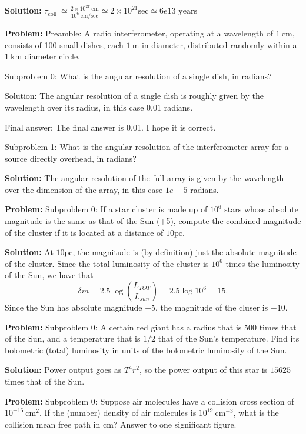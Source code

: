 \documentclass[10pt]{article}
\begin{document}
\textbf{Solution:}
$\tau_{\text {coll }} \simeq \frac{2 \times 10^{27} \mathrm{~cm}}{10^{6} \mathrm{~cm} / \mathrm{sec}} \simeq 2 \times 10^{21} \mathrm{sec} \simeq \boxed{6e13} \text { years }$


\textbf{Problem:}
Preamble: A radio interferometer, operating at a wavelength of $1 \mathrm{~cm}$, consists of 100 small dishes, each $1 \mathrm{~m}$ in diameter, distributed randomly within a $1 \mathrm{~km}$ diameter circle. 

Subproblem 0: What is the angular resolution of a single dish, in radians?


Solution: The angular resolution of a single dish is roughly given by the wavelength over its radius, in this case $\boxed{0.01}$ radians.

Final answer: The final answer is 0.01. I hope it is correct.

Subproblem 1: What is the angular resolution of the interferometer array for a source directly overhead, in radians?


\textbf{Solution:}
The angular resolution of the full array is given by the wavelength over the dimension of the array, in this case $\boxed{1e-5}$ radians.


\textbf{Problem:}
Subproblem 0: If a star cluster is made up of $10^{6}$ stars whose absolute magnitude is the same as that of the Sun (+5), compute the combined magnitude of the cluster if it is located at a distance of $10 \mathrm{pc}$.


\textbf{Solution:}
At $10 \mathrm{pc}$, the magnitude is (by definition) just the absolute magnitude of the cluster.  Since the total luminosity of the cluster is $10^{6}$ times the luminosity of the Sun, we have that 
\begin{equation}
\delta m = 2.5 \log \left( \frac{L_{TOT}}{L_{sun}} \right) = 2.5 \log 10^6 = 15.
\end{equation}
Since the Sun has absolute magnitude +5, the magnitude of the cluser is $\boxed{-10}$.


\textbf{Problem:}
Subproblem 0: A certain red giant has a radius that is 500 times that of the Sun, and a temperature that is $1 / 2$ that of the Sun's temperature. Find its bolometric (total) luminosity in units of the bolometric luminosity of the Sun.


\textbf{Solution:}
Power output goes as $T^4r^2$, so the power output of this star is $\boxed{15625}$ times that of the Sun.


\textbf{Problem:}
Subproblem 0: Suppose air molecules have a collision cross section of $10^{-16} \mathrm{~cm}^{2}$. If the (number) density of air molecules is $10^{19} \mathrm{~cm}^{-3}$, what is the collision mean free path in cm? Answer to one significant figure.
\end{document}
